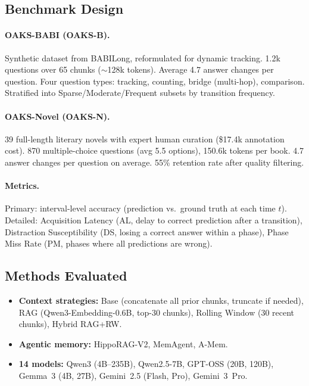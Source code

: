 \documentclass[11pt]{article}
\begin{document}
\subsection{Benchmark Design}

\paragraph{OAKS-BABI (OAKS-B).} Synthetic dataset from BABILong, reformulated for dynamic tracking. 1.2k questions over 65 chunks (${\sim}$128k tokens). Average 4.7 answer changes per question. Four question types: tracking, counting, bridge (multi-hop), comparison. Stratified into Sparse/Moderate/Frequent subsets by transition frequency.

\paragraph{OAKS-Novel (OAKS-N).} 39 full-length literary novels with expert human curation (\$17.4k annotation cost). 870 multiple-choice questions (avg 5.5 options), 150.6k tokens per book. 4.7 answer changes per question on average. 55\% retention rate after quality filtering.

\paragraph{Metrics.} Primary: interval-level accuracy (prediction vs.\ ground truth at each time $t$). Detailed: Acquisition Latency (AL, delay to correct prediction after a transition), Distraction Susceptibility (DS, losing a correct answer within a phase), Phase Miss Rate (PM, phases where all predictions are wrong).

\subsection{Methods Evaluated}

\begin{itemize}
    \item \textbf{Context strategies:} Base (concatenate all prior chunks, truncate if needed), RAG (Qwen3-Embedding-0.6B, top-30 chunks), Rolling Window (30 recent chunks), Hybrid RAG+RW.
    \item \textbf{Agentic memory:} HippoRAG-V2, MemAgent, A-Mem.
    \item \textbf{14 models:} Qwen3 (4B--235B), Qwen2.5-7B, GPT-OSS (20B, 120B), Gemma~3 (4B, 27B), Gemini~2.5 (Flash, Pro), Gemini~3~Pro.
\end{itemize}
\end{document}
